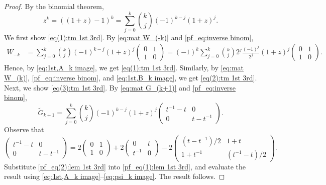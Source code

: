\documentclass[11pt]{article}%
\theoremstyle{definition}
\theoremstyle{plain}
\begin{document}
\begin{proof}
By the binomial theorem,
\begin{equation}\label{pf_eq:inverse binom}
	z^k=((1+z)-1)^k
	=\sum_{j=0}^k {k\choose j}(-1)^{k-j}(1+z)^j.
\end{equation}
We first show \eqref{eq(1):tm 1st 3rd}.
By \eqref{eq:mat W_(-k)} and \eqref{pf_eq:inverse binom},
\begin{align*}
	W_{-k}
	&=\sum_{j=0}^k {k\choose j}(-1)^{k-j}(1+z)^j
	\begin{pmatrix}
	0&1\\
	1&0
	\end{pmatrix}
	=(-1)^k\sum_{j=0}^k {k\choose j}2^j
	\frac{(-1)^j}{2^j}(1+z)^j
	\begin{pmatrix}
	0&1\\
	1&0
	\end{pmatrix}.
\end{align*}
Hence, by \eqref{eq:1st,A_k image}, we get \eqref{eq(1):tm 1st 3rd}.
Similarly, by \eqref{eq:mat W_(k)}, \eqref{pf_eq:inverse binom}, and \eqref{eq:1st,B_k image}, we get \eqref{eq(2):tm 1st 3rd}.
Next, we show \eqref{eq(3):tm 1st 3rd}.
By \eqref{eq:mat G_(k+1)} and \eqref{pf_eq:inverse binom},
\begin{equation}\label{pf_eq(1):lem 1st 3rd}
	\tilde G_{k+1}
	=
	\sum_{j=0}^k {k\choose j}(-1)^{k-j}(1+z)^j
	\begin{pmatrix}
	t^{-1}-t&0\\
	0&t-t^{-1}
	\end{pmatrix}.
\end{equation}
Observe that
\begin{equation}\label{pf_eq(2):lem 1st 3rd}
	\begin{pmatrix}
	t^{-1}-t&0\\[2pt]
	0&t-t^{-1}
	\end{pmatrix}
	=
	2\begin{pmatrix}
	0&1\\[2pt]
	1&0
	\end{pmatrix}
	+
	2\begin{pmatrix}
	0&t\\[2pt]
	t^{-1}&0
	\end{pmatrix}
	-
	2\begin{pmatrix}
	(t-t^{-1})/2&1+t\\[2pt]
	1+t^{-1}&(t^{-1}-t)/2
	\end{pmatrix}.
\end{equation}
Substitute \eqref{pf_eq(2):lem 1st 3rd} into \eqref{pf_eq(1):lem 1st 3rd}, and evaluate the result using \eqref{eq:1st,A_k image}--\eqref{eq:psi_k image}.
The result follows.
\end{proof}
\end{document}
